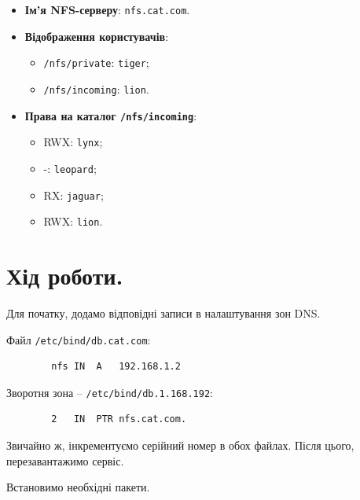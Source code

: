 \documentclass[14pt, a4paper]{extreport}
\begin{document}
	\begin{itemize}
		\item \textbf{Ім'я NFS-серверу}: \texttt{nfs.cat.com}.
		
		\item \textbf{Відображення користувачів}:
		
		\begin{itemize}
			\item \texttt{/nfs/private}: \texttt{tiger};
			
			\item \texttt{/nfs/incoming}: \texttt{lion}.
		\end{itemize}
		
		\item \textbf{Права на каталог \texttt{/nfs/incoming}}:
		
		\begin{itemize}
			\item RWX: \texttt{lynx};
			
			\item -: \texttt{leopard};
			
			\item RX: \texttt{jaguar};
			
			\item RWX: \texttt{lion}.
		\end{itemize}
	\end{itemize}
	
	\section*{Хід роботи.}
	
	Для початку, додамо відповідні записи в налаштування зон DNS.
	
	Файл \texttt{/etc/bind/db.cat.com}: \sideat{[VM 1]}
	
	\begin{verbatim}
		nfs	IN	A	192.168.1.2
	\end{verbatim}
	
	Зворотня зона -- \texttt{/etc/bind/db.1.168.192}: \sideat{[VM 1]}
	
	\begin{verbatim}
		2	IN	PTR	nfs.cat.com.
	\end{verbatim}
	
	Звичайно ж, інкрементуємо серійний номер в обох файлах. Після цього, перезавантажимо сервіс.
	
	
	Встановимо необхідні пакети.
	
\end{document}
